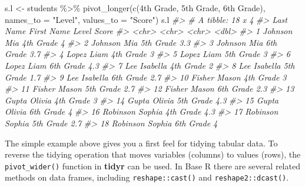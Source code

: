 \documentclass[
]{book}
\newenvironment{Shaded}{\begin{snugshade}}{\end{snugshade}}
\newcommand{\AttributeTok}[1]{\textcolor[rgb]{0.77,0.63,0.00}{#1}}
\newcommand{\CommentTok}[1]{\textcolor[rgb]{0.56,0.35,0.01}{\textit{#1}}}
\newcommand{\FunctionTok}[1]{\textcolor[rgb]{0.00,0.00,0.00}{#1}}
\newcommand{\NormalTok}[1]{#1}
\newcommand{\OtherTok}[1]{\textcolor[rgb]{0.56,0.35,0.01}{#1}}
\newcommand{\SpecialCharTok}[1]{\textcolor[rgb]{0.00,0.00,0.00}{#1}}
\newcommand{\StringTok}[1]{\textcolor[rgb]{0.31,0.60,0.02}{#1}}
\begin{document}
\begin{Shaded}
\begin{Highlighting}[]
\NormalTok{s.l }\OtherTok{\textless{}{-}}\NormalTok{ students }\SpecialCharTok{\%\textgreater{}\%}
 \FunctionTok{pivot\_longer}\NormalTok{(}\FunctionTok{c}\NormalTok{(}\StringTok{\textquotesingle{}4th Grade\textquotesingle{}}\NormalTok{, }\StringTok{\textquotesingle{}5th Grade\textquotesingle{}}\NormalTok{, }\StringTok{\textquotesingle{}6th Grade\textquotesingle{}}\NormalTok{),}
 \AttributeTok{names\_to =} \StringTok{"Level"}\NormalTok{,}
 \AttributeTok{values\_to =} \StringTok{"Score"}\NormalTok{)}
\NormalTok{s.l}
\CommentTok{\#\textgreater{} \# A tibble: 18 x 4}
\CommentTok{\#\textgreater{}    \textasciigrave{}Last Name\textasciigrave{} \textasciigrave{}First Name\textasciigrave{} Level     Score}
\CommentTok{\#\textgreater{}    \textless{}chr\textgreater{}       \textless{}chr\textgreater{}        \textless{}chr\textgreater{}     \textless{}dbl\textgreater{}}
\CommentTok{\#\textgreater{}  1 Johnson     Mia          4th Grade   4  }
\CommentTok{\#\textgreater{}  2 Johnson     Mia          5th Grade   3.3}
\CommentTok{\#\textgreater{}  3 Johnson     Mia          6th Grade   3.7}
\CommentTok{\#\textgreater{}  4 Lopez       Liam         4th Grade   3  }
\CommentTok{\#\textgreater{}  5 Lopez       Liam         5th Grade   3  }
\CommentTok{\#\textgreater{}  6 Lopez       Liam         6th Grade   4.3}
\CommentTok{\#\textgreater{}  7 Lee         Isabella     4th Grade   2  }
\CommentTok{\#\textgreater{}  8 Lee         Isabella     5th Grade   1.7}
\CommentTok{\#\textgreater{}  9 Lee         Isabella     6th Grade   2.7}
\CommentTok{\#\textgreater{} 10 Fisher      Mason        4th Grade   3  }
\CommentTok{\#\textgreater{} 11 Fisher      Mason        5th Grade   2.7}
\CommentTok{\#\textgreater{} 12 Fisher      Mason        6th Grade   2.3}
\CommentTok{\#\textgreater{} 13 Gupta       Olivia       4th Grade   3  }
\CommentTok{\#\textgreater{} 14 Gupta       Olivia       5th Grade   4.3}
\CommentTok{\#\textgreater{} 15 Gupta       Olivia       6th Grade   4  }
\CommentTok{\#\textgreater{} 16 Robinson    Sophia       4th Grade   4.3}
\CommentTok{\#\textgreater{} 17 Robinson    Sophia       5th Grade   2.7}
\CommentTok{\#\textgreater{} 18 Robinson    Sophia       6th Grade   4}
\end{Highlighting}
\end{Shaded}

The simple example above gives you a first feel for tidying tabular data. To reverse the tidying operation that moves variables (columns) to values (rows), the \texttt{pivot\_wider()} function in \textbf{tidyr} can be used. In Base R there are several related methods on data frames, including \texttt{reshape::cast()} and \texttt{reshape2::dcast()}.
\end{document}

